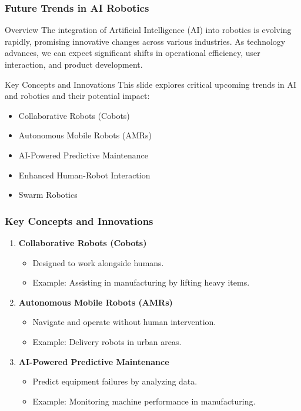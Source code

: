 \documentclass[aspectratio=169]{beamer}
\begin{document}
\begin{frame}[fragile]
    \frametitle{Future Trends in AI Robotics}
    \begin{block}{Overview}
        The integration of Artificial Intelligence (AI) into robotics is evolving rapidly, promising innovative changes across various industries. As technology advances, we can expect significant shifts in operational efficiency, user interaction, and product development.
    \end{block}
    \begin{block}{Key Concepts and Innovations}
        This slide explores critical upcoming trends in AI and robotics and their potential impact:
        \begin{itemize}
            \item Collaborative Robots (Cobots)
            \item Autonomous Mobile Robots (AMRs)
            \item AI-Powered Predictive Maintenance
            \item Enhanced Human-Robot Interaction
            \item Swarm Robotics
        \end{itemize}
    \end{block}
\end{frame}

\begin{frame}[fragile]
    \frametitle{Key Concepts and Innovations}
    \begin{enumerate}
        \item \textbf{Collaborative Robots (Cobots)}
            \begin{itemize}
                \item Designed to work alongside humans.
                \item Example: Assisting in manufacturing by lifting heavy items.
            \end{itemize}

        \item \textbf{Autonomous Mobile Robots (AMRs)}
            \begin{itemize}
                \item Navigate and operate without human intervention.
                \item Example: Delivery robots in urban areas.
            \end{itemize}

        \item \textbf{AI-Powered Predictive Maintenance}
            \begin{itemize}
                \item Predict equipment failures by analyzing data.
                \item Example: Monitoring machine performance in manufacturing.
            \end{itemize}
    \end{enumerate}
\end{frame}
\end{document}
